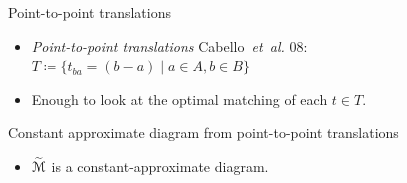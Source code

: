 \documentclass[xcolor={dvipsnames,usenames},handout]{beamer} %
\newcommand{\mycite}[1]{{\color{LimeGreen}\lbrack #1\rbrack}}
\newcommand{\etal}{\textit{et~al.}}
\newcommand{\tildeM}{\widetilde{\EuScript{M}}}
\def\EMPH#1{\textcolor{BrickRed}{{\emph{#1}}}}
\begin{document}
\begin{frame}{Point-to-point translations}
\begin{itemize}
\item \EMPH{Point-to-point translations} \mycite{Cabello~{\etal} 08}:
	$T \coloneqq \{t_{ba} = (b - a) \mid a \in A, b \in B\}$
\item Enough to look at the optimal matching of each $t \in T$.
\end{itemize}
\end{frame}

\begin{frame}{Constant approximate diagram from point-to-point translations}
\begin{itemize}
\item $\tildeM$ is a constant-approximate diagram.
\end{itemize}
\end{frame}
\end{document}
